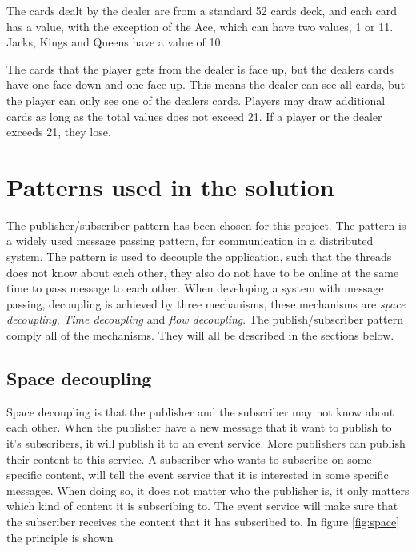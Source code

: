 The cards dealt by the dealer are from a standard 52 cards deck, and each card has a value, with the exception of the Ace, which can have two values, 1 or 11. Jacks, Kings and Queens have a value of 10.  

The cards that the player gets from the dealer is face up, but the dealers cards have one face down and one face up. This means the dealer can see all cards, but the player can only see one of the dealers cards. Players may draw additional cards as long as the total values does not exceed 21. If a player or the dealer exceeds 21, they lose. 

\section{Patterns used in the solution}
\label{chp:patterns}
The publisher/subscriber pattern has been chosen for this project. The pattern is a widely used message passing pattern, for communication in a distributed system. The pattern is used to decouple the application, such that the threads does not know about each other, they also do not have to be online at the same time to pass message to each other. When developing a system with message passing, decoupling is achieved by three mechanisms, these mechanisms are \emph{space decoupling}, \emph{Time decoupling} and \emph{flow decoupling}. The publish/subscriber pattern comply all of the mechanisms. They will all be described in the sections below.

\subsection{Space decoupling}
Space decoupling is that the publisher and the subscriber may not know about each other. When the publisher have a new message that it want to publish to it's subscribers, it will publish it to an event service. More publishers can publish their content to this service. A subscriber who wants to subscribe on some specific content, will tell the event service that it is interested in some specific messages. When doing so, it does not matter who the publisher is, it only matters which kind of content it is subscribing to. The event service will make sure that the subscriber receives the content that it has subscribed to. In figure \ref{fig:space} the principle is shown


